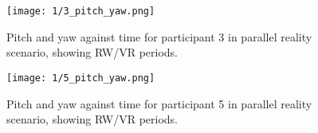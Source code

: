 \begin{figure}
	\begin{center}
	\texttt{[image: 1/3\_pitch\_yaw.png]}
	\caption{Pitch and yaw against time for participant 3 in parallel reality scenario, showing RW/VR periods.}
	\label{3_pitch_yaw.png}
	\end{center}
\end{figure}

\begin{figure}
	\begin{center}
	\texttt{[image: 1/5\_pitch\_yaw.png]}
	\caption{Pitch and yaw against time for participant 5 in parallel reality scenario, showing RW/VR periods.}
	\label{5_pitch_yaw.png}
	\end{center}
\end{figure}

